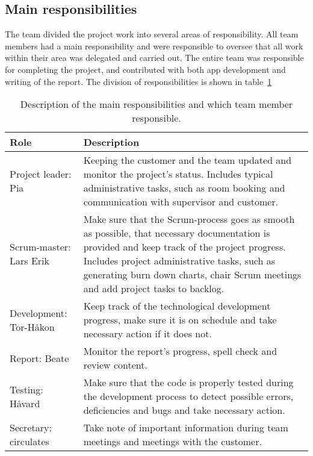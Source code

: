 \newpage
\subsection{Main responsibilities}

The team divided the project work into several areas of responsibility. All team members had a main responsibility and were responsible to oversee that all work within their area was delegated and carried out. The entire team was responsible for completing the project, and contributed with both app development and writing of the report. The division of responsibilities is shown in table~\ref{tab:mainResponsibilities}


\begin{table}[H]
\centering
{}
\begin{tabular}{|l|p{11.2cm}|}
\hline
\textbf{Role} & \textbf{Description}\\\hline
Project leader: Pia & Keeping the customer and the team updated and monitor the project's status. Includes typical administrative tasks, such as room booking and communication with supervisor and customer.\\\hline
Scrum-master: Lars Erik & Make sure that the Scrum-process goes as smooth as possible, that necessary documentation is provided and keep track of the project progress. Includes project administrative tasks, such as generating burn down charts, chair Scrum meetings and add project tasks to backlog.\\\hline
Development: Tor-Håkon & Keep track of the technological development progress, make sure it is on schedule and take necessary action if it does not.\\\hline
Report: Beate & Monitor the report's progress, spell check and review content.\\\hline
Testing: Håvard & Make sure that the code is properly tested during the development process to detect possible errors, deficiencies and bugs and take necessary action. \\\hline
Secretary: circulates & Take note of important information during team meetings and meetings with the customer.\\\hline
\end{tabular}
\caption{Description of the main responsibilities and which team member responsible.}
\label{tab:mainResponsibilities}
\end{table}

